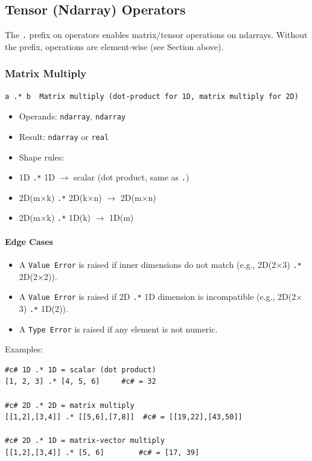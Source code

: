 \subsection{Tensor (Ndarray) Operators}
The \texttt{.} prefix on operators enables matrix/tensor operations on ndarrays. Without the prefix, operations are element-wise (see Section above).

\subsubsection{Matrix Multiply}
\begin{verbatim}
a .* b  Matrix multiply (dot-product for 1D, matrix multiply for 2D)
\end{verbatim}

\begin{itemize}
\item Operands: \texttt{ndarray}, \texttt{ndarray}
\item Result: \texttt{ndarray} or \texttt{real}
\item Shape rules:
  \item 1D \texttt{.*} 1D $\rightarrow$ scalar (dot product, same as \texttt{.})
  \item 2D(m$\times$k) \texttt{.*} 2D(k$\times$n) $\rightarrow$ 2D(m$\times$n)
  \item 2D(m$\times$k) \texttt{.*} 1D(k) $\rightarrow$ 1D(m)
\end{itemize}

\paragraph{Edge Cases}
\begin{itemize}
\item A \texttt{Value Error} is raised if inner dimensions do not match (e.g., 2D(2$\times$3) \texttt{.*} 2D(2$\times$2)).
\item A \texttt{Value Error} is raised if 2D \texttt{.*} 1D dimension is incompatible (e.g., 2D(2$\times$3) \texttt{.*} 1D(2)).
\item A \texttt{Type Error} is raised if any element is not numeric.
\end{itemize}

Examples:
\begin{verbatim}
#c# 1D .* 1D = scalar (dot product)
[1, 2, 3] .* [4, 5, 6]     #c# = 32

#c# 2D .* 2D = matrix multiply
[[1,2],[3,4]] .* [[5,6],[7,8]]  #c# = [[19,22],[43,50]]

#c# 2D .* 1D = matrix-vector multiply
[[1,2],[3,4]] .* [5, 6]        #c# = [17, 39]
\end{verbatim}

